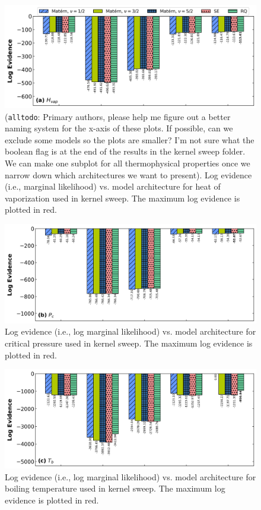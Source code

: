 \documentclass[journal=jacsat,manuscript=article]{achemso}
\newcommand{\alltodo}[1]{{\color{Cyan} (\texttt{alltodo}: #1)}}
\begin{document}
\begin{figure}
    \centering
    \includegraphics[width=\linewidth]{images/lml_bar_chart_Hvap.png}
    \caption{\alltodo{Primary authors, please help me figure out a better naming system for the x-axis of these plots. If possible, can we exclude some models so the plots are smaller? I'm not sure what the boolean flag is at the end of the results in the kernel sweep folder. We can make one subplot for all thermophysical properties once we narrow down which architectures we want to present}. Log evidence (i.e., marginal likelihood) vs. model architecture for heat of vaporization used in kernel sweep. The maximum log evidence is plotted in red.}
\end{figure}
\begin{figure}
    \centering
    \includegraphics[width=\linewidth]{images/lml_bar_chart_Pc.png}
    \caption{Log evidence (i.e., log marginal likelihood) vs. model architecture for critical pressure used in kernel sweep. The maximum log evidence is plotted in red.}
\end{figure}
\begin{figure}
    \centering
    \includegraphics[width=\linewidth]{images/lml_bar_chart_Tb.png}
    \caption{Log evidence (i.e., log marginal likelihood) vs. model architecture for boiling temperature used in kernel sweep. The maximum log evidence is plotted in red.}
\end{figure}
\end{document}
